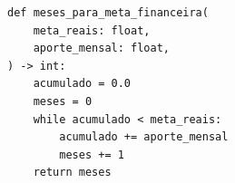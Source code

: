 \ifmostrarGabarito
\begin{verbatim}
def meses_para_meta_financeira(
    meta_reais: float,
    aporte_mensal: float,
) -> int:
    acumulado = 0.0
    meses = 0
    while acumulado < meta_reais:
        acumulado += aporte_mensal
        meses += 1
    return meses
\end{verbatim}

\fi
